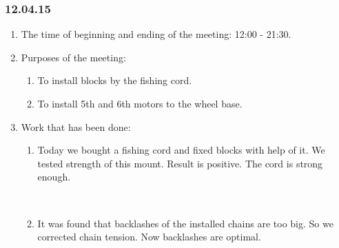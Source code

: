 \subsubsection{12.04.15}
\begin{enumerate}
	
	\item The time of beginning and ending of the meeting: 12:00 - 21:30.
	
	\item Purposes of the meeting: 
	\begin{enumerate}
		
		\item To install blocks by the fishing cord.
		
		\item To install 5th and 6th motors to the wheel base.

	\end{enumerate}

	\item Work that has been done:
	\begin{enumerate}
		
		\item Today we bought a fishing cord and fixed blocks with help of it. We tested strength of this mount. Result is positive. The cord is strong enough.
		\begin{figure}[H]
			\begin{minipage}[h]{0.2\linewidth}
				\center  
			\end{minipage}
			\begin{minipage}[h]{0.6\linewidth}
				\caption{}
			\end{minipage}
		\end{figure}
		
		\item It was found that backlashes of the installed chains are too big. So we corrected chain tension. Now backlashes are optimal.
		

\end{enumerate}
\end{enumerate}
